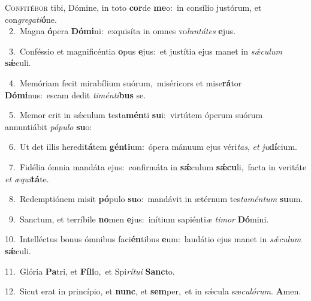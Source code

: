 \lettrine{\initial\textcolor{\initialcolor}{C}}{onfitébor} tibi, Dómine, in toto \textbf{cor}\-de \textbf{me}\-o:~\star in consílio justórum, et con\-\textit{gre}\-\textit{ga}\textit{ti}\textbf{ó}ne.\\
{\numbfont\textcolor{\numbcolor}{~2.}}~Magna \textbf{ó}\-pera \textbf{Dó}\-\textbf{mi}ni:~\star exquisíta in omnes vo\-\textit{lun}\-\textit{tá}\textit{tes} \textbf{e}\-jus.\par
{\numbfont\textcolor{\numbcolor}{~3.}}~Conféssio et magnificéntia \textbf{o}\-pus \textbf{e}\-jus:~\star et justítia ejus manet in \textit{sǽ}\-\textit{cu}\textit{lum} \textbf{sǽ}\-culi.\par
{\numbfont\textcolor{\numbcolor}{~4.}}~Memóriam fecit mirabílium suórum,~\dagger miséricors et mise\-\textbf{rá}\-tor \textbf{Dó}\-\textbf{mi}nus:~\star escam dedit \textit{ti}\-\textit{mén}\textit{ti}\textbf{bus} se.\par
{\numbfont\textcolor{\numbcolor}{~5.}}~Memor erit in sǽculum testa\-\textbf{mén}\-ti \textbf{su}\-i:~\star virtútem óperum suórum annuntiábit \textit{pó}\-\textit{pu}\textit{lo} \textbf{su}\-o:\par
{\numbfont\textcolor{\numbcolor}{~6.}}~Ut det illis heredi\-\textbf{tá}\-tem \textbf{gén}\-\textbf{ti}um:~\star ópera mánuum ejus véri\-\textit{tas}\-, \textit{et} \textit{ju}\-\textbf{dí}cium.\par
{\numbfont\textcolor{\numbcolor}{~7.}}~Fidélia ómnia mandáta ejus:~\dagger confirmáta in \textbf{sǽ}\-culum \textbf{sǽ}\-\textbf{cu}li,~\star facta in veritáte \textit{et} \textit{æ}\-\textit{qui}\textbf{tá}te.\par
{\numbfont\textcolor{\numbcolor}{~8.}}~Redemptiónem misit \textbf{pó}\-pulo \textbf{su}\-o:~\star mandávit in ætérnum tes\-\textit{ta}\-\textit{mén}\textit{tum} \textbf{su}\-um.\par
{\numbfont\textcolor{\numbcolor}{~9.}}~Sanctum, et terríbile \textbf{no}\-men \textbf{e}\-jus:~\star inítium sapiénti\textit{æ} \textit{ti}\-\textit{mor} \textbf{Dó}\-mini.\par
{\numbfont\textcolor{\numbcolor}{10.}}~Intelléctus bonus ómnibus faci\-\textbf{én}\-tibus \textbf{e}\-um:~\star laudátio ejus manet in \textit{sǽ}\-\textit{cu}\textit{lum} \textbf{sǽ}\-culi.\par
{\numbfont\textcolor{\numbcolor}{11.}}~Glória \textbf{Pa}\-tri, et \textbf{Fí}\-\textbf{li}o,~\star et Spi\-\textit{rí}\-\textit{tu}\textit{i} \textbf{Sanc}\-to.\par
{\numbfont\textcolor{\numbcolor}{12.}}~Sicut erat in princípio, et \textbf{nunc}\-, et \textbf{sem}\-per,~\star et in sǽcula sæ\-\textit{cu}\-\textit{ló}\textit{rum}. \textbf{A}\-men.\par
